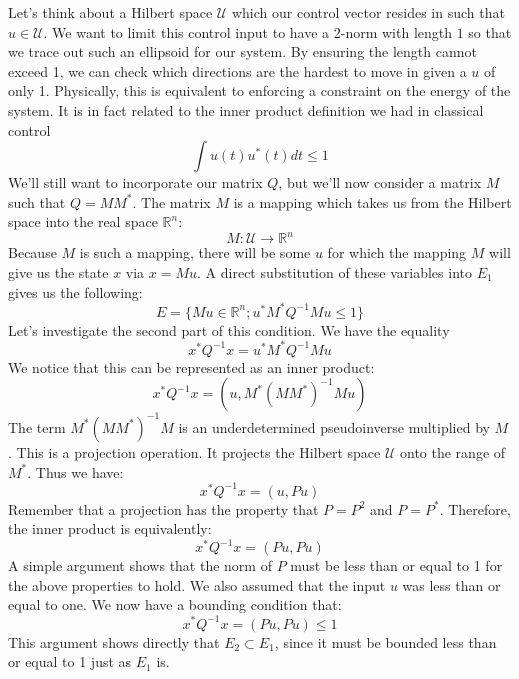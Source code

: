 Let's think about a Hilbert space $\mathcal{U}$ which our control vector resides in such that $u\in\mathcal{U}$. We want to limit this control input to have a 2-norm with length $1$ so that we trace out such an ellipsoid for our system. By ensuring the length cannot exceed 1, we can check which directions are the hardest to move in given a $u$ of only 1. Physically, this is equivalent to enforcing a constraint on the energy of the system. It is in fact related to the inner product definition we had in classical control
$$\int u(t)u^*(t)dt\le1$$
We'll still want to incorporate our matrix $Q$, but we'll now consider a matrix $M$ such that $Q=MM^*$. The matrix $M$ is a mapping which takes us from the Hilbert space into the real space $\mathbb{R}^n$:
$$M:\mathcal{U}\rightarrow\mathbb{R}^n$$
Because $M$ is such a mapping, there will be some $u$ for which the mapping $M$ will give us the state $x$ via $x=Mu$. A direct substitution of these variables into $E_1$ gives us the following:
$$E=\{Mu\in\mathbb{R}^n;u^*M^*Q^{-1}Mu\le1\}$$
Let's investigate the second part of this condition. We have the equality
$$x^*Q^{-1}x=u^*M^*Q^{-1}Mu$$
We notice that this can be represented as an inner product:
$$x^*Q^{-1}x=(u,M^*(MM^*)^{-1}Mu)$$
The term $M^*(MM^*)^{-1}M$ is an underdetermined pseudoinverse multiplied by $M$. This is a projection operation. It projects the Hilbert space $\mathcal{U}$ onto the range of $M^*$. Thus we have:
$$x^*Q^{-1}x=(u,Pu)$$
Remember that a projection has the property that $P=P^2$ and $P=P^*$. Therefore, the inner product is equivalently:
$$x^*Q^{-1}x=(Pu,Pu)$$
A simple argument shows that the norm of $P$ must be less than or equal to 1 for the above properties to hold. We also assumed that the input $u$ was less than or equal to one. We now have a bounding condition that:
$$x^*Q^{-1}x=(Pu,Pu)\le1$$
This argument shows directly that $E_2\subset E_1$, since it must be bounded less than or equal to 1 just as $E_1$ is.

